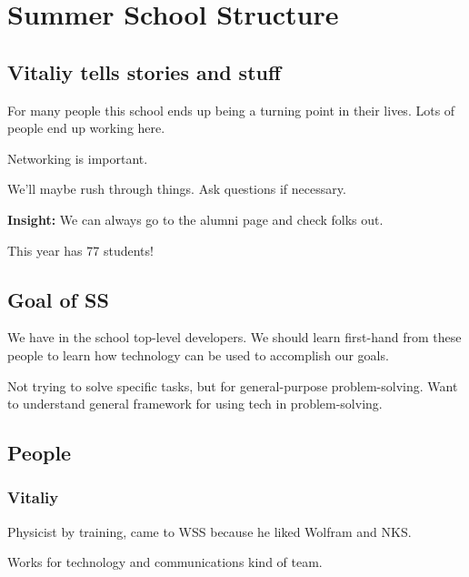 \documentclass[11pt]{article}
\theoremstyle{definition}
\begin{document}
\noindent\hrulefill





\section{Summer School Structure}

\subsection{Vitaliy tells stories and stuff}

For many people this school ends up being a turning point in their lives. Lots of people end up working here.

Networking is important.

We'll maybe rush through things. Ask questions if necessary. 

\textbf{Insight:} We can always go to the alumni page and check folks out. 

This year has 77 students!

\subsection{Goal of SS}

We have in the school top-level developers. We should learn first-hand from these people to learn how technology can be used to accomplish our goals. 

Not trying to solve specific tasks, but for general-purpose problem-solving. Want to understand general framework for using tech in problem-solving. 

\subsection{People}

\subsubsection{Vitaliy}

Physicist by training, came to WSS because he liked Wolfram and NKS. 

Works for technology and communications kind of team.
\end{document}
